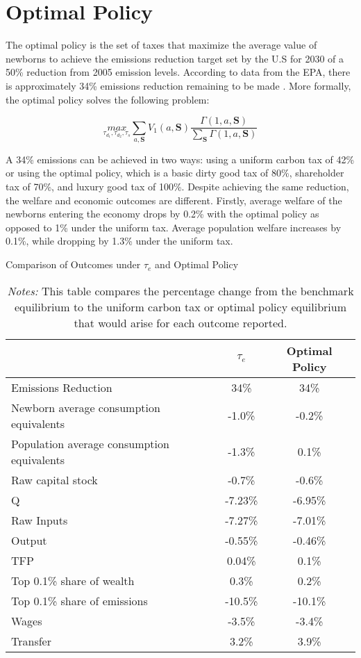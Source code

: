 \documentclass[12pt,a4paper]{article}
\begin{document}
\section{Optimal Policy}

\hspace*{6mm} The optimal policy is the set of taxes that maximize the average value of newborns to achieve the emissions reduction target set by the U.S for 2030 of a 50\% reduction from 2005 emission levels. According to data from the EPA,  there is approximately 34\% emissions reduction remaining to be made \citep{epa2024datahighlights}. More formally, the optimal policy solves the following problem:

\begin{equation}
\underset{\tau_{d_1} , \tau_{d_2} , \tau_s}{max} \sum_{a, \textbf{S}} V_1(a, \textbf{S}) \frac{\Gamma(1, a, \textbf{S})}{\sum_{\textbf{S}} \Gamma(1, a, \textbf{S})} 
\end{equation}


\hspace*{6mm} A 34\% emissions can be achieved in two ways: using a uniform carbon tax of 42\% or using the optimal policy, which is a basic dirty good tax of 80\%, shareholder tax of 70\%, and luxury good tax of 100\%. Despite achieving the same reduction, the welfare and economic outcomes are different. Firstly, average welfare of the newborns entering the economy drops by 0.2\% with the optimal policy as opposed to 1\% under the uniform tax. Average population welfare increases by 0.1\%, while dropping by 1.3\% under the uniform tax. 

\begin{table}[h]
\centering
\caption{Comparison of Outcomes under $\tau_e$ and Optimal Policy}
\begin{tabular}{lcc}
\hline
 & $\tau_e$ & Optimal Policy \\
\hline
Emissions Reduction & 34\% & 34\% \\
Newborn average consumption equivalents & -1.0\% & -0.2\% \\
Population average consumption equivalents & -1.3\% & 0.1\% \\
Raw capital stock & -0.7\% & -0.6\% \\
Q & -7.23\% & -6.95\% \\
Raw Inputs & -7.27\% & -7.01\% \\ 
Output & -0.55\% & -0.46\% \\
TFP & 0.04\% & 0.1\% \\
Top 0.1\% share of wealth & 0.3\% & 0.2\% \\
Top 0.1\% share of emissions & -10.5\% & -10.1\% \\
Wages & -3.5\% & -3.4\% \\
Transfer & 3.2\% & 3.9\% \\
\hline
\end{tabular}
\captionsetup{font=footnotesize}
\caption*{\textit{Notes:} This table compares the percentage change from the benchmark equilibrium to the uniform carbon tax or optimal policy equilibrium that would arise for each outcome reported.}
\end{table}
\end{document}
